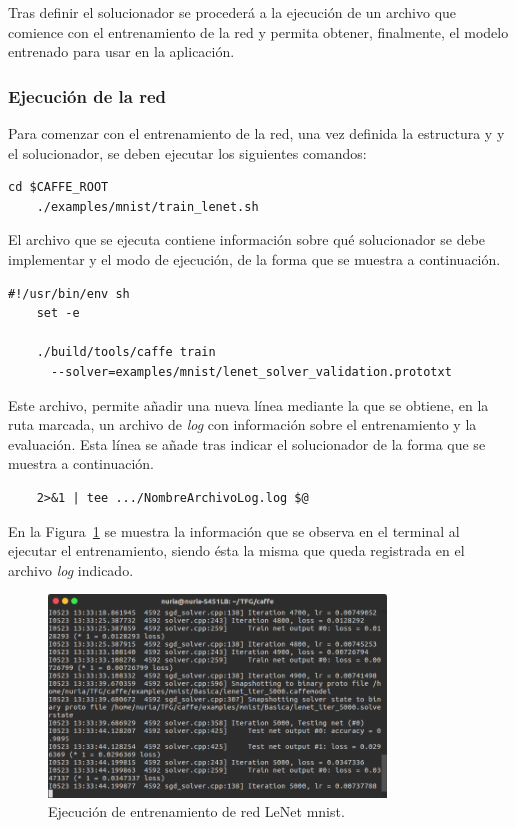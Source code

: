 	Tras definir el solucionador se procederá a la ejecución de un archivo que comience con el entrenamiento de la red y permita obtener, finalmente, el modelo entrenado para usar en la aplicación.\\
	
\subsubsection{Ejecución de la red}
	Para comenzar con el entrenamiento de la red, una vez definida la estructura y y el solucionador, se deben ejecutar los siguientes comandos:
	\vspace{10pt}
	\begin{lstlisting}[frame=single]
	cd $CAFFE_ROOT
	./examples/mnist/train_lenet.sh	
	\end{lstlisting}
	
	El archivo que se ejecuta contiene información sobre qué solucionador se debe implementar y el modo de ejecución, de la forma que se muestra a continuación.
	\vspace{10pt}
	\begin{lstlisting}[frame=single]
	#!/usr/bin/env sh
	set -e
	
	./build/tools/caffe train 
	  --solver=examples/mnist/lenet_solver_validation.prototxt 
	\end{lstlisting}
	Este archivo, permite añadir una nueva línea mediante la que se obtiene, en la ruta marcada, un archivo de \textit{log} con información sobre el entrenamiento y la evaluación. Esta línea se añade tras indicar el solucionador de la forma que se muestra a continuación.
	\vspace{10pt}
	\begin{lstlisting}
	2>&1 | tee .../NombreArchivoLog.log $@
	\end{lstlisting} 
	
	En la Figura~\ref{fig.entrenamiento} se muestra la información que se observa en el terminal al ejecutar el entrenamiento, siendo ésta la misma que queda registrada en el archivo \textit{log} indicado.
	
	\begin{figure}[H]
		\begin{center}
			\includegraphics[width=0.8\textwidth]{figures/RedBasica5000}
			\caption{Ejecución de entrenamiento de red LeNet \acrshort{mnist}.}
			\label{fig.entrenamiento}
		\end{center}
	\end{figure}
	
